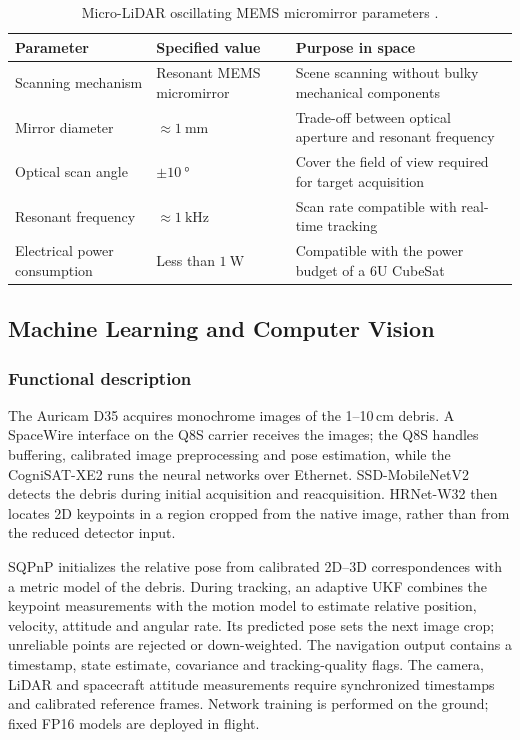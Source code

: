 \documentclass[11pt,a4paper]{article}
\begin{document}
\begin{itemize}
    \begin{table}[H]
      \centering
      \small
      \caption{Micro-LiDAR oscillating MEMS micromirror parameters \cite{Liu2022}.}
      \label{tab:lidar_mems}
      \begin{tabular}{p{3.3cm} p{4.7cm} p{6.5cm}}
        \toprule
        \textbf{Parameter} & \textbf{Specified value} & \textbf{Purpose in space} \\
        \midrule
        Scanning mechanism & Resonant MEMS micromirror & Scene scanning without bulky mechanical components \\ %
        Mirror diameter & $\approx\SI{1}{\milli\metre}$ & Trade-off between optical aperture and resonant frequency \\ %
        Optical scan angle & $\pm\SI{10}{\degree}$ & Cover the field of view required for target acquisition \\ %
        Resonant frequency & $\approx\SI{1}{\kilo\hertz}$ & Scan rate compatible with real-time tracking \\ %
        Electrical power consumption & Less than $\SI{1}{\watt}$ & Compatible with the power budget of a 6U CubeSat \\ %
        \bottomrule
      \end{tabular}
    \end{table}
\end{itemize}


\subsection{Machine Learning and Computer Vision}\label{subsec:ml_cv}

\subsubsection{Functional description}
The Auricam D35 acquires monochrome images of the 1--10\,cm debris. A SpaceWire
interface on the Q8S carrier receives the images; the Q8S handles buffering,
calibrated image preprocessing and pose estimation, while the CogniSAT-XE2 runs
the neural networks over Ethernet. SSD-MobileNetV2 detects the debris during
initial acquisition and reacquisition. HRNet-W32 then locates 2D keypoints in a
region cropped from the native image, rather than from the reduced detector input.

SQPnP initializes the relative pose from calibrated 2D--3D correspondences with
a metric model of the debris. During tracking, an adaptive UKF combines the
keypoint measurements with the motion model to estimate relative position,
velocity, attitude and angular rate. Its predicted pose sets the next image
crop; unreliable points are rejected or down-weighted. The navigation output
contains a timestamp, state estimate, covariance and tracking-quality flags.
The camera, LiDAR and spacecraft attitude measurements require synchronized
timestamps and calibrated reference frames. Network training is performed on
the ground; fixed FP16 models are deployed in flight.
\end{document}
